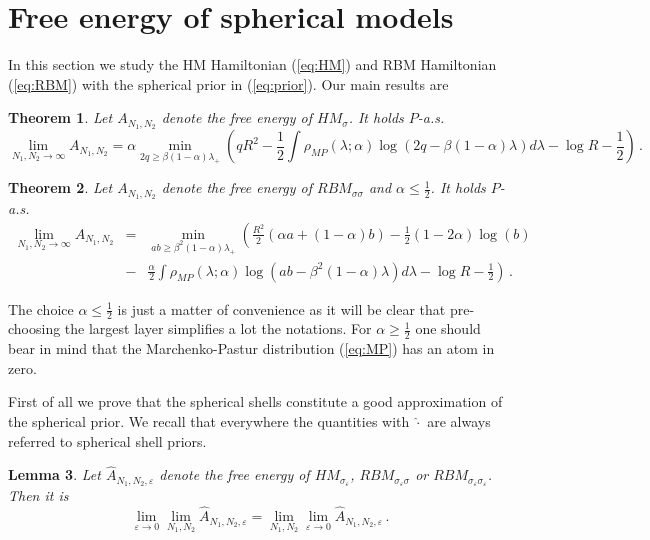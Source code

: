 \documentclass[10pt,oneside,a4paper,reqno]{amsart}  %
\def\be{\begin{equation}}
\def\ee{\end{equation}}
\def\a{\alpha}
\def\e{\varepsilon}
\def\d{\delta}
\def\b{\beta}
\def\l{\lambda}
\def\r{\rho}
\def\s{\sigma}
\theoremstyle{plain}
\newtheorem{theorem}{Theorem}[section]
\newtheorem{lemma}[theorem]{Lemma}
\numberwithin{equation}{section}
\begin{document}
\section{Free energy of spherical models}\label{section:sferico} 

In this section we study the HM Hamiltonian (\ref{eq:HM}) and RBM Hamiltonian (\ref{eq:RBM}) with the spherical prior in (\ref{eq:prior}).  Our main results are
\begin{theorem}\label{Th:HM-sfer}
Let $A_{N_1,N_2}$ denote the free energy of $HM_{\s}$. It holds $P$-a.s.
\be\label{eq:AHMsfer}
\lim_{N_1,N_2\to\infty} A_{N_1,N_2} = \a\min_{2q\geq \b(1-\a)\l_+}\left(q R^2 -\frac 12\int\r_{MP}(\l;\a)\log(2q-\b(1-\a)\l) d\l-\log R-\frac12\right)\,.
\ee
\end{theorem}

\begin{theorem}\label{Th:Bip-sfer}
Let $A_{N_1,N_2}$ denote the free energy of $RBM_{\s\s}$ and $\a\leq \frac 12$. It holds $P$-a.s.
\begin{eqnarray}
\lim_{N_1,N_2\to\infty} A_{N_1,N_2} &=&\min_{ab\geq \b^2(1-\a)\l_+}\left(\frac{R^2}{2}\left(\a a + (1-\a) b\right) -\frac 1 2 (1-2\a)\log(b)\right. \nonumber \\
 &-&\left.\frac \a2\int\r_{MP}(\l;\a)\log(ab-\b^2(1-\a)\l) d\l-\log R-\frac12\right) \label{eq:Bip-sfer}\,.
\end{eqnarray}
\end{theorem}

The choice $\a\leq\frac12$ is just a matter of convenience as it will be clear that pre-choosing the largest layer simplifies a lot the notations. For $\alpha\geq \frac12$ one should bear in mind that the Marchenko-Pastur distribution (\ref{eq:MP}) has an atom in zero. 

First of all we prove that the spherical shells constitute a good approximation of the spherical prior. 
We recall that everywhere the quantities with $\widehat \cdot$ are always referred to spherical shell priors. 

\begin{lemma}\label{lemma-gusci}
Let $\widehat A_{N_1,N_2,\e}$ denote the free energy of $HM_{\s_\e}$, $RBM_{\s_\e\s}$ or $RBM_{\s_\e\s_\e}$. Then it is
$$
\lim_{\e\to0}\lim_{N_1,N_2} \widehat A_{N_1,N_2,\e}=\lim_{N_1,N_2}\lim_{\e\to0} \widehat A_{N_1,N_2,\e}\,. 
$$
\end{lemma}
\end{document}

